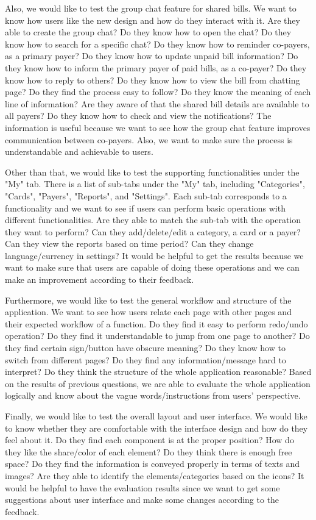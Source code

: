 \documentclass{sigchi}
\begin{document}
Also, we would like to test the group chat feature for shared bills. We want to know how users like the new design and how do they interact with it. Are they able to create the group chat? Do they know how to open the chat? Do they know how to search for a specific chat? Do they know how to reminder co-payers, as a primary payer? Do they know how to update unpaid bill information? Do they know how to inform the primary payer of paid bills, as a co-payer? Do they know how to reply to others? Do they know how to view the bill from chatting page? Do they find the process easy to follow? Do they know the meaning of each line of information? Are they aware of that the shared bill details are available to all payers? Do they know how to check and view the notifications? The information is useful because we want to see how the group chat feature improves communication between co-payers. Also, we want to make sure the process is understandable and achievable to users.

Other than that, we would like to test the supporting functionalities under the "My" tab. There is a list of sub-tabs under the "My" tab, including "Categories", "Cards", "Payers", "Reports", and "Settings". Each sub-tab corresponds to a functionality and we want to see if users can perform basic operations with different functionalities. Are they able to match the sub-tab with the operation they want to perform? Can they add/delete/edit a category, a card or a payer? Can they view the reports based on time period? Can they change language/currency in settings? It would be helpful to get the results because we want to make sure that users are capable of doing these operations and we can make an improvement according to their feedback. 

Furthermore, we would like to test the general workflow and structure of the application. We want to see how users relate each page with other pages and their expected workflow of a function. Do they find it easy to perform redo/undo operation? Do they find it understandable to jump from one page to another? Do they find certain sign/button have obscure meaning? Do they know how to switch from different pages? Do they find any information/message hard to interpret? Do they think the structure of the whole application reasonable? Based on the results of previous questions, we are able to evaluate the whole application logically and know about the vague words/instructions from users' perspective. 

Finally, we would like to test the overall layout and user interface. We would like to know whether they are comfortable with the interface design and how do they feel about it. Do they find each component is at the proper position? How do they like the share/color of each element? Do they think there is enough free space? Do they find the information is conveyed properly in terms of texts and images? Are they able to identify the elements/categories based on the icons? It would be helpful to have the evaluation results since we want to get some suggestions about user interface and make some changes according to the feedback. 
\end{document}
